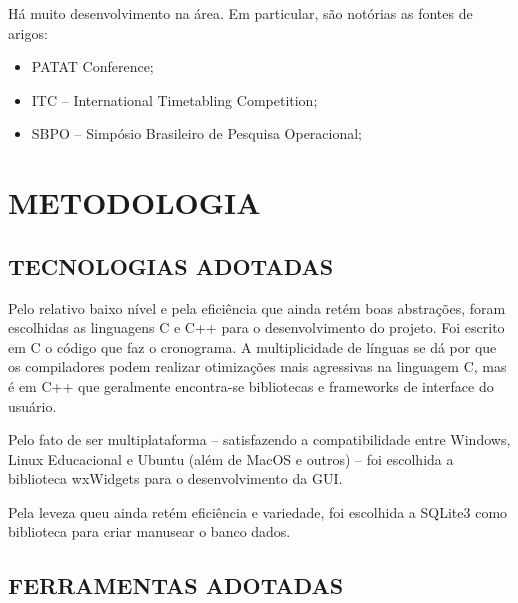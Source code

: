 \documentclass[12pt,a4paper]{article}
\begin{document}
		Há muito desenvolvimento na área. Em particular, são notórias as fontes de arigos:

		\begin{itemize}
			\item PATAT Conference;
			\item ITC -- International Timetabling Competition;
			\item SBPO -- Simpósio Brasileiro de Pesquisa Operacional;
		\end{itemize}

	\newpage

	\section{METODOLOGIA}

		\subsection{TECNOLOGIAS ADOTADAS}

		\par Pelo relativo baixo nível e pela eficiência que ainda retém boas abstrações, foram escolhidas as linguagens C e C++ para o desenvolvimento do projeto. Foi escrito em C o código que faz o cronograma. A multiplicidade de línguas se dá por que os compiladores podem realizar otimizações mais agressivas na linguagem C, mas é em C++ que geralmente encontra-se bibliotecas e frameworks de interface do usuário.

		\par Pelo fato de ser multiplataforma -- satisfazendo a compatibilidade entre Windows, Linux Educacional e Ubuntu (além de MacOS e outros) -- foi escolhida a biblioteca wxWidgets para o desenvolvimento da GUI.

		\par Pela leveza queu ainda retém eficiência e variedade, foi escolhida a SQLite3 como biblioteca para criar manusear o banco dados.

		\subsection{FERRAMENTAS ADOTADAS}
\end{document}
